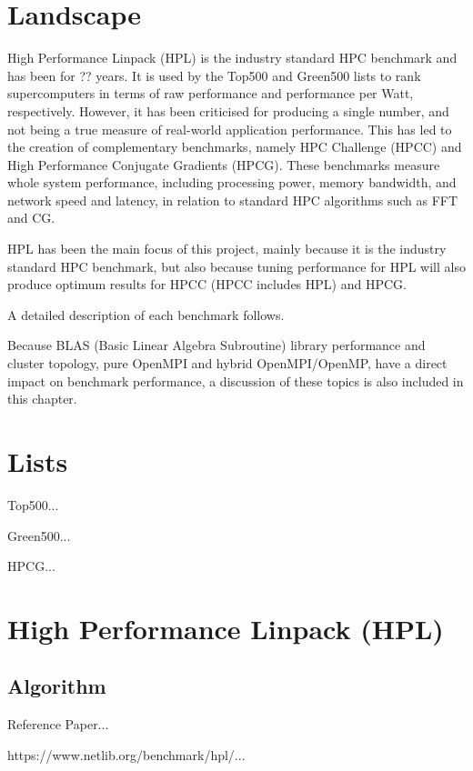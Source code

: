 \documentclass{report}
\begin{document}
%
%
\section{Landscape}

High Performance Linpack (HPL) is the industry standard HPC benchmark and has been for ?? years. It is used by the Top500 and Green500 lists to rank supercomputers in terms of raw performance and performance per Watt, respectively. However, it has been criticised for producing a single number, and not being a true measure of real-world application performance. This has led to the creation of complementary benchmarks, namely HPC Challenge (HPCC) and High Performance Conjugate Gradients (HPCG). These benchmarks measure whole system performance, including processing power, memory bandwidth, and network speed and latency, in relation to standard HPC algorithms such as FFT and CG.

HPL has been the main focus of this project, mainly because it is the industry standard HPC benchmark, but also because tuning performance for HPL will also produce optimum results for HPCC (HPCC includes HPL) and HPCG.

A detailed description of each benchmark follows.

Because BLAS (Basic Linear Algebra Subroutine) library performance and cluster topology, pure OpenMPI and hybrid OpenMPI/OpenMP, have a direct impact on benchmark performance, a discussion of these topics is also included in this chapter. 


%
%
\section{Lists} 

Top500...

Green500...

HPCG...


%
%
\section{High Performance Linpack (HPL)}

%
%
\subsection{Algorithm}

Reference Paper...

https://www.netlib.org/benchmark/hpl/...
\end{document}

